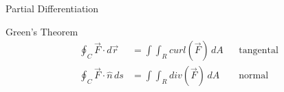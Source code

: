 \begin{section}{Partial Differentiation}
  \begin{section}{Green's Theorem}
    \begin{align*}
      \oint_C \vec{F} \cdot d\vec{r} &= \int\int_R curl(\vec{F})\,dA && \text{tangental} \\
      \oint_C \vec{F} \cdot \hat{n}\, ds &= \int\int_R div(\vec{F})\,dA && \text{normal} \\
    \end{align*}
  \end{section}



\end{section}
